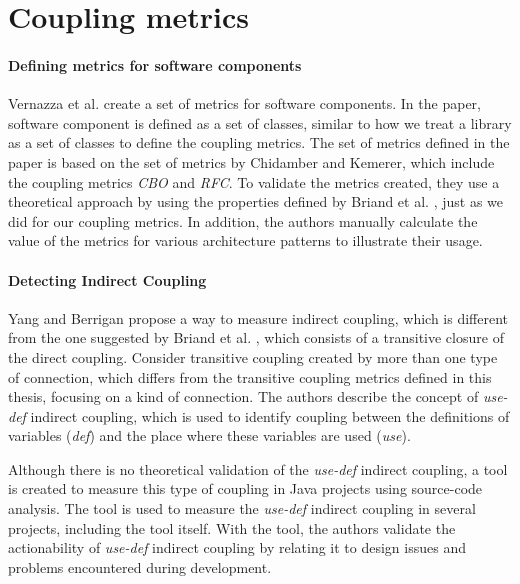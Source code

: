\section{Coupling metrics}

\paragraph{Defining metrics for software components \cite{Vernazza2000}}

Vernazza et al. create a set of metrics for software components. In the paper, software component is defined as a set of classes, similar to how we treat a library as a set of classes to define the coupling metrics. The set of metrics defined in the paper is based on the set of metrics by Chidamber and Kemerer, which include the coupling metrics \textit{CBO} and \textit{RFC}. To validate the metrics created, they use a theoretical approach by using the properties defined by Briand et al. \cite{briand1996property}, just as we did for our coupling metrics. In addition, the authors manually calculate the value of the metrics for various architecture patterns to illustrate their usage.

\paragraph{Detecting Indirect Coupling \cite{yang2005detecting}}

Yang and Berrigan propose a way to measure indirect coupling, which is different from the one suggested by Briand et al. \cite{briand1999unified}, which consists of a transitive closure of the direct coupling. Consider transitive coupling created by more than one type of connection, which differs from the transitive coupling metrics defined in this thesis, focusing on a kind of connection. The authors describe the concept of \textit{use-def} indirect coupling, which is used to identify coupling between the definitions of variables (\textit{def}) and the place where these variables are used (\textit{use}).

Although there is no theoretical validation of the \textit{use-def} indirect coupling, a tool is created to measure this type of coupling in Java projects using source-code analysis. The tool is used to measure the \textit{use-def} indirect coupling in several projects, including the tool itself. With the tool, the authors validate the actionability of \textit{use-def} indirect coupling by relating it to design issues and problems encountered during development.

